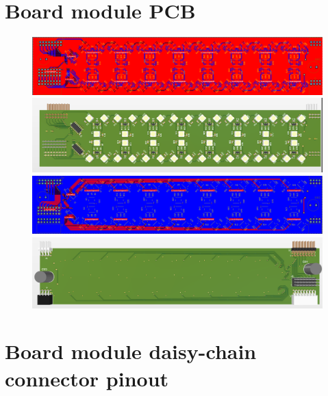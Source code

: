 \documentclass{article}
\begin{document}
\begin{appendices}
	\section{Board module PCB}

	\begin{figure}[H]
		\includegraphics[width=\textwidth]{appendix/pcb_top.png}
		\includegraphics[width=\textwidth]{appendix/pcb_3d_top.png}
		\includegraphics[width=\textwidth]{appendix/pcb_bot.png}
		\includegraphics[width=\textwidth]{appendix/pcb_3d_bot.png}
	\end{figure}

	\newpage

	\section{Board module daisy-chain connector pinout}

	\begin{figure}[H]
		
	\end{figure}
\end{appendices}
\end{document}
